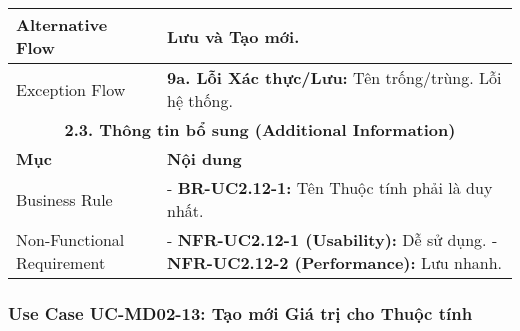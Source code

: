 \begin{longtable}{|m{4cm}|p{11cm}|}
\hline
Alternative Flow & Lưu và Tạo mới. \\
\hline
Exception Flow & \textbf{9a. Lỗi Xác thực/Lưu:} Tên trống/trùng. Lỗi hệ thống. \\
\hline
\multicolumn{2}{|c|}{\textbf{2.3. Thông tin bổ sung (Additional Information)}} \\
\hline
\textbf{Mục} & \textbf{Nội dung} \\
\hline
Business Rule & - \textbf{BR-UC2.12-1:} Tên Thuộc tính phải là duy nhất. \\
\hline
Non-Functional Requirement & - \textbf{NFR-UC2.12-1 (Usability):} Dễ sử dụng. \newline - \textbf{NFR-UC2.12-2 (Performance):} Lưu nhanh. \\
\hline
\end{longtable}

\subsubsection{Use Case UC-MD02-13: Tạo mới Giá trị cho Thuộc tính}

